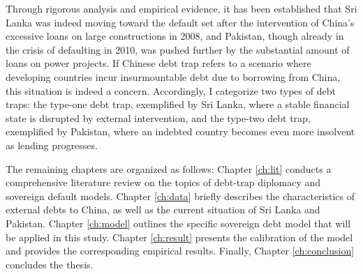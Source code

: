 Through rigorous analysis and empirical evidence, it has been established that
Sri Lanka was indeed moving toward the default set after the intervention of China's excessive loans on large constructions in 2008, and Pakistan, though already in the crisis of defaulting in 2010, was pushed further by the substantial amount of loans on power projects.
If Chinese debt trap refers to a scenario where developing countries incur insurmountable debt due to borrowing from China, this situation is indeed a concern.
Accordingly, I categorize two types of debt traps: the type-one debt trap, exemplified by Sri Lanka, where a stable financial state is disrupted by external intervention, and the type-two debt trap, exemplified by Pakistan, where an indebted country becomes even more insolvent as lending progresses.

The remaining chapters are organized as follows:
Chapter \ref{ch:lit} conducts a comprehensive literature review on the topics of debt-trap diplomacy and sovereign default models.
Chapter \ref{ch:data} briefly describes the characteristics of external debts to China, as well as the current situation of Sri Lanka and Pakistan.
Chapter \ref{ch:model} outlines the specific sovereign debt model that will be applied in this study.
Chapter \ref{ch:result} presents the calibration of the model and provides the corresponding empirical results.
Finally, Chapter \ref{ch:conclusion} concludes the thesis.


